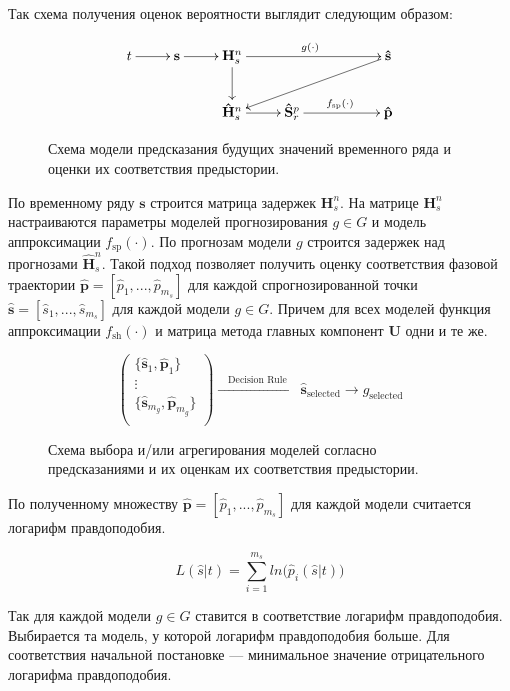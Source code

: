 \documentclass[article,14pt,subf,href,colorlinks=true
]{disser}
\begin{document}
Так схема получения оценок вероятности выглядит следующим образом:
\begin{figure}[H]
    \centering
    \captionsetup{justification=centering,margin=2cm}
\[
\xymatrix{
  t \ar[r] &
  \mathbf{s} \ar[r] &
  \mathbf{H}_{s}^{n} \ar[d] \ar[rrr]^{g(\cdot)} &&&
  \mathbf{\hat{s}} \ar[llld]
  \\
  &&
  \mathbf{\hat{H}}_{s}^{n} \ar[r]&
  \mathbf{\hat{S}}_{r}^{p} \ar[rr]^{f_{\text{sp}}(\cdot)}&&
  \mathbf{\hat{p}}
}
\]
\caption{Схема модели предсказания будущих значений временного ряда и оценки их соответствия предыстории.}
\end{figure}

По временному ряду $\mathbf{s}$ строится матрица задержек $\mathbf{H}_{s}^{n}$.
На матрице $\mathbf{H}_{s}^{n}$ настраиваются параметры моделей прогнозирования $g \in G$ и модель аппроксимации $f_{\text{sp}}(\cdot)$.
По прогнозам модели $g$ строится задержек над прогнозами $\mathbf{\hat{H}}_{s}^{n}$.
Такой подход позволяет получить оценку соответствия фазовой траектории  $\mathbf{\hat{p}}=[\hat{p}_1,...,\hat{p}_{m_s}]$ для каждой спрогнозированной точки $\mathbf{\hat{s}}=[\hat{s}_1,...,\hat{s}_{m_s}]$ для каждой модели $g \in G$.
Причем для всех моделей функция аппроксимации $f_{\text{sh}}(\cdot)$ и матрица метода главных компонент $\mathbf{U}$ одни и те же.
\begin{figure}[H]
    \centering
    \captionsetup{justification=centering,margin=2cm}
\[
\begin{pmatrix} 
	\{\mathbf{\hat{s}}_1, \mathbf{\hat{p}}_1\}\\
	\vdots\\
    \{\mathbf{\hat{s}}_{m_{g}}, \mathbf{\hat{p}}_{m_{g}}\}\\
\end{pmatrix}
\xrightarrow{
    \quad
    \text{Decision Rule}
    \quad
}
\mathbf{\hat{s}}_{\text{selected}}
\xrightarrow{}
g_{\text{selected}}
\]
\caption{Схема выбора и/или агрегирования моделей согласно предсказаниями и их оценкам их соответствия предыстории.}
\end{figure}

По полученному множеству $\mathbf{\hat{p}}=[\hat{p}_1,...,\hat{p}_{m_s}]$ для каждой модели считается логарифм правдоподобия.

\begin{equation*}
 L(\hat{s}|t) =  \sum_{i = 1}^{m_s}ln\big(\hat{p}_i(\hat{s}|t)\big)
\end{equation*}

Так для каждой модели $g \in G$  ставится в соответствие логарифм правдоподобия.  
Выбирается та модель, у которой логарифм правдоподобия больше. Для соответствия начальной постановке --- минимальное значение отрицательного логарифма правдоподобия.
\end{document}
